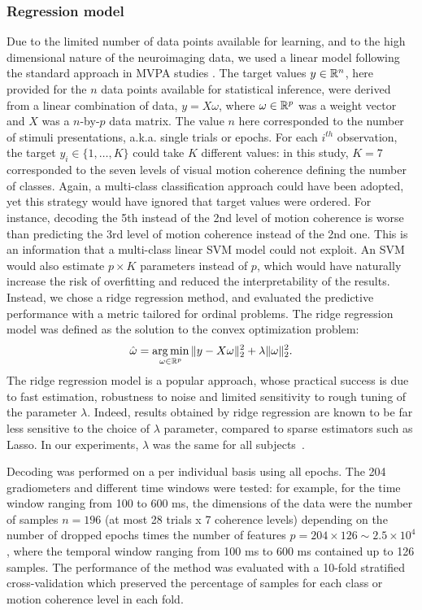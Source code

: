 \subsubsection*{Regression model}
Due to the limited number of data points available for learning, and to the high dimensional nature of the neuroimaging data, we used a linear model following the standard approach in MVPA studies
\cite{5kamitani2005decoding,20mitchell2008predicting,11haynes2015primer}. The target values $y\in\mathbb{R}^n$, here provided for the $n$ data points available for statistical inference, were derived from a linear combination of data, $y=X\omega$, where $\omega\in\mathbb{R}^p$ was a weight vector and $X$ was a $n$-by-$p$ data matrix. The value $n$ here corresponded to the number of stimuli presentations, a.k.a. single trials or epochs. For each $i^{th}$ observation, the target $y_i\in\{1,\dots,K\}$ could take $K$ different values: in this study, $K=7$ corresponded to the seven levels of visual motion coherence defining the number of classes. Again, a multi-class classification approach could have been adopted, yet this strategy would have ignored that target values were ordered. For instance, decoding the 5th instead of the 2nd level of motion coherence is worse than predicting the 3rd level of motion coherence instead of the 2nd one. This is an information that a multi-class linear SVM model could not exploit. An SVM would also estimate $p\times K$ parameters instead of $p$, which would have naturally increase the risk of overfitting and reduced the interpretability of the results.\\
Instead, we chose a ridge regression method, and evaluated the predictive performance with a metric tailored for ordinal problems. The ridge regression model was defined as the solution to the convex optimization problem:
\begin{equation}
	\hat{\omega} = \mathop{\mathrm{arg}\,\mathrm{min}}_{\omega\in\mathbb{R}^p}\|y-X\omega\|_2^2 + \lambda\|\omega\|_2^2.
\end{equation}
The ridge regression model is a popular approach, whose practical success is due to fast estimation, robustness to noise and limited sensitivity to rough tuning of the parameter $\lambda$. Indeed, results obtained by ridge regression are known to be far less sensitive to the choice of $\lambda$ parameter, compared to sparse estimators such as Lasso. In our experiments, $\lambda$ was the same for all subjects~\cite{Varoquaux2017166}.

Decoding was  performed on a per individual basis using all epochs. The 204 gradiometers and different time windows were tested: for example, for the time window ranging from 100 to 600 ms, the dimensions of the data were the number of samples $n=196$ (at most 28 trials x 7 coherence levels) depending on the number of dropped epochs times the number of features $p=204 \times 126 \sim 2.5 \times 10^4$, where the temporal window ranging from 100 ms to 600 ms contained up to 126 samples. The performance of the method was evaluated with a 10-fold stratified cross-validation which preserved the percentage of samples for each class or motion coherence level in each fold.

